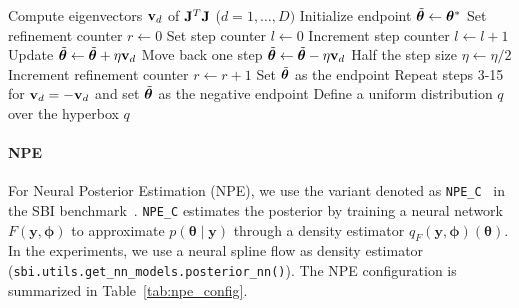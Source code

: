 \begin{algorithm}[!ht]
  \caption{Hyperbox Computation \newline
    \textit{Input:} Optimal point \(\thb^*\), distance function \(d(\thb)\), Jacobian \(\jac\) at \(\thb^*\) \newline
    \textit{Parameters:} Step size \(\eta\), number of refinements \(R\), number of steps \(L\), distance threshold \(\epsilon\)}
  \label{alg:region_construction}
  \begin{algorithmic}[1]
    \State Compute eigenvectors \(\mathbf{v}_d\) of \(\mathbf{J}^T\mathbf{J}\) {\scriptsize (\(d = 1,\ldots,D)\)}
      \State Initialize endpoint \(\Tilde{\boldsymbol{\theta}} \gets \boldsymbol{\theta}^*\)
      \State Set refinement counter \(r \gets 0\)
      \Repeat{}
        \State Set step counter \(l \gets 0\)
        \Repeat{}
          \State Increment step counter \(l \gets l + 1\)
          \State Update \(\Tilde{\boldsymbol{\theta}} \gets \Tilde{\boldsymbol{\theta}} + \eta \mathbf{v}_d\)
        \State Move back one step \(\Tilde{\boldsymbol{\theta}} \gets \Tilde{\boldsymbol{\theta}} - \eta \mathbf{v}_d\)
        \State Half the step size \(\eta \gets \eta/2\)
        \State Increment refinement counter \(r \gets r + 1\)
      \State Set \(\Tilde{\boldsymbol{\theta}}\) as the endpoint
      \State Repeat steps 3-15 for \(\mathbf{v}_d = - \mathbf{v}_d\) and set \(\Tilde{\boldsymbol{\theta}}\) as the negative endpoint
    \EndFor
    \State Define a uniform distribution \(q\) over the hyperbox
    \State \Return \(q\)
  \end{algorithmic}
\end{algorithm}


\paragraph{NPE}

For Neural Posterior Estimation (NPE), we use the variant denoted as \texttt{NPE\_C}~\citep{greenberg2019automatic} in the SBI benchmark~\citep{lueckmann2021benchmarking}.
\texttt{NPE\_C} estimates the posterior by training a neural network \( F(\mathbf{y}, \boldsymbol{\phi}) \) to approximate \( p(\boldsymbol{\theta} \mid \mathbf{y}) \) through a density estimator \( q_F(\mathbf{y}, \boldsymbol{\phi})(\boldsymbol{\theta}) \).
In the experiments, we use a neural spline flow as density estimator (\texttt{sbi.utils.get\_nn\_models.posterior\_nn()}).
The NPE configuration is summarized in Table~\ref{tab:npe_config}.

